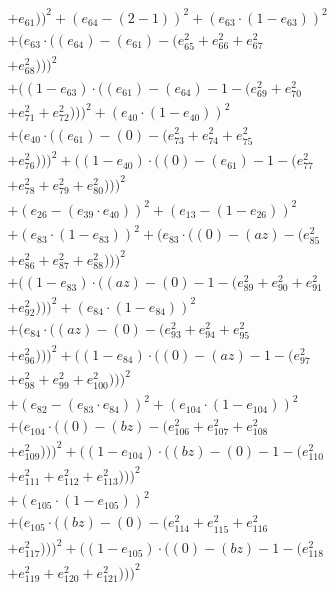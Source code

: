 \documentclass[10pt, a4paper]{article}
\begin{document}
\begin{small}
\begin{align*}
& + e_{61}))^{2} + (e_{64} - (2 - 1))^{2} + (e_{63}  \cdot  (1 - e_{63}))^{2} \\
& + (e_{63}  \cdot  ((e_{64}) - (e_{61}) - (e_{65}^{2} + e_{66}^{2} + e_{67}^{2} \\
& + e_{68}^{2})))^{2} \\
& + ((1 - e_{63})  \cdot  ((e_{61}) - (e_{64}) - 1 - (e_{69}^{2} + e_{70}^{2} \\
& + e_{71}^{2} + e_{72}^{2})))^{2} + (e_{40}  \cdot  (1 - e_{40}))^{2} \\
& + (e_{40}  \cdot  ((e_{61}) - (0) - (e_{73}^{2} + e_{74}^{2} + e_{75}^{2} \\
& + e_{76}^{2})))^{2} + ((1 - e_{40})  \cdot  ((0) - (e_{61}) - 1 - (e_{77}^{2} \\
& + e_{78}^{2} + e_{79}^{2} + e_{80}^{2})))^{2} \\
& + (e_{26} - (e_{39}  \cdot  e_{40}))^{2} + (e_{13} - (1 - e_{26}))^{2} \\
& + (e_{83}  \cdot  (1 - e_{83}))^{2} + (e_{83}  \cdot  ((0) - (az) - (e_{85}^{2} \\
& + e_{86}^{2} + e_{87}^{2} + e_{88}^{2})))^{2} \\
& + ((1 - e_{83})  \cdot  ((az) - (0) - 1 - (e_{89}^{2} + e_{90}^{2} + e_{91}^{2} \\
& + e_{92}^{2})))^{2} + (e_{84}  \cdot  (1 - e_{84}))^{2} \\
& + (e_{84}  \cdot  ((az) - (0) - (e_{93}^{2} + e_{94}^{2} + e_{95}^{2} \\
& + e_{96}^{2})))^{2} + ((1 - e_{84})  \cdot  ((0) - (az) - 1 - (e_{97}^{2} \\
& + e_{98}^{2} + e_{99}^{2} + e_{100}^{2})))^{2} \\
& + (e_{82} - (e_{83}  \cdot  e_{84}))^{2} + (e_{104}  \cdot  (1 - e_{104}))^{2} \\
& + (e_{104}  \cdot  ((0) - (bz) - (e_{106}^{2} + e_{107}^{2} + e_{108}^{2} \\
& + e_{109}^{2})))^{2} + ((1 - e_{104})  \cdot  ((bz) - (0) - 1 - (e_{110}^{2} \\
& + e_{111}^{2} + e_{112}^{2} + e_{113}^{2})))^{2} \\
& + (e_{105}  \cdot  (1 - e_{105}))^{2} \\
& + (e_{105}  \cdot  ((bz) - (0) - (e_{114}^{2} + e_{115}^{2} + e_{116}^{2} \\
& + e_{117}^{2})))^{2} + ((1 - e_{105})  \cdot  ((0) - (bz) - 1 - (e_{118}^{2} \\
& + e_{119}^{2} + e_{120}^{2} + e_{121}^{2})))^{2} \\

\end{align*}
\end{small}
\end{document}
